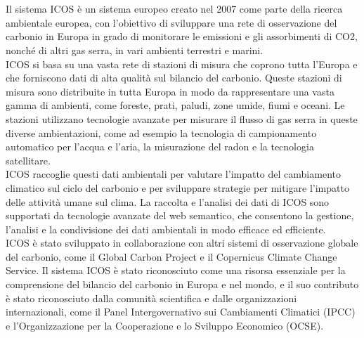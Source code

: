 \chapter{\introductionname}
\label{chap:introduction}

Il sistema ICOS è un sistema europeo creato nel 2007 come parte della ricerca 
ambientale europea, con l'obiettivo di sviluppare una rete di osservazione del carbonio in Europa
in grado di monitorare le emissioni e gli assorbimenti di CO2, nonché di altri gas serra,
in vari ambienti terrestri e marini.\\

ICOS si basa su una vasta rete di stazioni di misura che coprono tutta l'Europa e che forniscono 
dati di alta qualità sul bilancio del carbonio. Queste stazioni di misura sono distribuite in 
tutta Europa in modo da rappresentare una vasta gamma di ambienti, come foreste, prati, paludi,
zone umide, fiumi e oceani. Le stazioni utilizzano tecnologie avanzate per misurare il flusso
di gas serra in queste diverse ambientazioni, come ad esempio la tecnologia di campionamento 
automatico per l'acqua e l'aria, la misurazione del radon e la tecnologia satellitare.\\

ICOS raccoglie questi dati ambientali per valutare l'impatto del cambiamento climatico
sul ciclo del carbonio e per sviluppare strategie per mitigare l'impatto delle attività
umane sul clima. La raccolta e l'analisi dei dati di ICOS sono supportati da tecnologie 
avanzate del web semantico, che consentono la gestione, l'analisi e la condivisione dei dati 
ambientali in modo efficace ed efficiente.\\

ICOS è stato sviluppato in collaborazione con altri sistemi di osservazione globale del carbonio,
come il Global Carbon Project e il Copernicus Climate Change Service.
Il sistema ICOS è stato riconosciuto come una risorsa essenziale per la comprensione
del bilancio del carbonio in Europa e nel mondo, e il suo contributo è stato riconosciuto
dalla comunità scientifica e dalle organizzazioni internazionali, come il Panel Intergovernativo
sui Cambiamenti Climatici (IPCC) e l'Organizzazione per la Cooperazione e lo Sviluppo Economico (OCSE).\\
